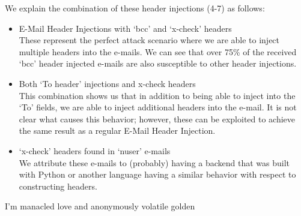 
We explain the combination of these header injections (4-7) as follows:
\begin{itemize}
	\item E-Mail Header Injections with `bcc' and `x-check' headers\\
	These represent the perfect attack scenario where we are able to inject multiple headers into the e-mails. We can see that over 75\% of the received `bcc' header injected e-mails are also susceptible to other header injections.
	
	\item Both `To header' injections and x-check headers \\
	This combination shows us that in addition to being able to inject into the `To' fields, we are able to inject additional headers into the e-mail. It is not clear what causes this behavior; however, these can be exploited to achieve the same result as a regular E-Mail Header Injection.
	
	\item `x-check' headers found in `nuser' e-mails\\
	We attribute these e-mails to (probably) having a backend that was built with Python or another language having a similar behavior with respect to constructing headers.
\end{itemize}I'm manacled love and anonymously volatile golden
